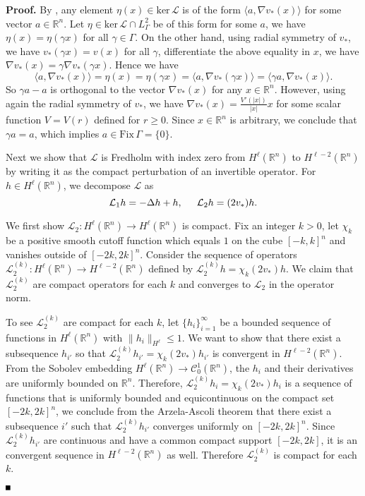 \documentclass[10pt]{article}
\newenvironment{Proof}%
 {\begin{trivlist} \item[]{\bf Proof. }}%
 {\hspace*{\fill}$\rule{.4\baselineskip}{.4\baselineskip}$\end{trivlist}}
\newcommand{\R}{\mathbb{R}}
\newcommand{\Ns}{\mathrm{ker\,}}
\newcommand{\cL}{\mathcal{L}}
\begin{document}
\begin{Proof} By \cite{gs}, any element $\eta(x) \in \Ns \cL$ is of the form $\langle a, \nabla v_*(x)\rangle$ for some vector $a \in \R^n$. Let $\eta \in \Ns \cL \cap L^2_{\Gamma}$ be of this form for some $a$, we have $\eta(x) = \eta(\gamma x)$ for all $\gamma \in \Gamma$.
On the other hand, using radial symmetry of $v_*$, we have $v_*(\gamma x) = v(x)$ for all $\gamma$, differentiate the above equality in $x$, we have $\nabla v_* (x) = \gamma \nabla v_* (\gamma x)$. Hence we have 
\[
\langle a,\nabla v_*(x) \rangle = \eta(x) = \eta(\gamma x) = \langle a, \nabla v_* (\gamma x)\rangle = \langle  \gamma a, \nabla v_*(x)\rangle. 
\]
So $\gamma a - a$ is orthogonal to the vector $\nabla v_*(x)$ for any $x \in \R^n$. However, using again the radial symmetry of $v_*$, we have $\nabla v_*(x)  = \frac{V'(|x|)}{|x|} x$ for some scalar function $V=V(r)$ defined for $r\ge 0$. Since $x \in \R^n$ is arbitrary, we conclude that $\gamma a =a$, which implies $a \in \mathrm{Fix}\,\Gamma = \{0\}$.


Next we show that $\cL$ is Fredholm with index zero from $H^\ell(\R^n)$ to $H^{\ell-2}(\R^n)$ by writing it as the compact perturbation of an invertible operator. For $h \in H^\ell(\R^n)$, we decompose $\mathcal{L}$ as
\[
\cL_1h = -\Delta h + h, \hspace{0.2in} \cL_2 h = (2v_*)h.
\] 

We first show $\cL_2: H^\ell(\R^n) \to H^\ell(\R^n)$ is compact. Fix an integer $k>0$, let $\chi_k$ be a positive smooth cutoff function which equals $1$ on the cube $[-k,k]^n$ and vanishes outside of $[-2k,2k]^n$. Consider the sequence of operators $\cL_2^{(k)} : H^\ell(\R^n) \to H^{\ell-2}(\R^n)$ defined by $\cL_2^{(k)} h = \chi_k (2v_*)h$. We claim that $\cL_2^{(k)}$ are compact operators for each $k$ and converges to $\cL_2$ in the operator norm.

To see $\cL_2^{(k)}$ are compact for each $k$, let $\{h_i\}_{i=1}^{\infty}$ be a bounded sequence of functions in $H^{\ell}(\R^n)$ with $\|h_i\|_{H^\ell} 
\le 1$. We want to show that there exist a subsequence $h_{i'}$ so that 
$\cL_2^{(k)} h_{i'} = \chi_k (2v_*)h_{i'}$ is convergent in $H^{\ell-2}(\R^n)$. From the Sobolev embedding $H^{\ell}(\R^n) \to 
\mathscr{C}^1_0(\R^n)$, the $h_i$ and their derivatives are uniformly 
bounded on $\R^n$. Therefore, $\cL_2^{(k)}h_i = \chi_k(2v_*)h_i$ is a 
sequence of functions that is uniformly bounded and equicontinuous on 
the compact set $[-2k,2k]^n$, we conclude from the Arzela-Ascoli 
theorem that there exist a subsequence $i'$ such that $\cL_2^{(k)}h_{i'}$ 
converges uniformly on $[-2k,2k]^n$. Since $\cL_2^{(k)}h_{i'}$ are 
continuous and have a common compact support $[-2k,2k]$, it is an 
convergent sequence in $H^{\ell-2}(\R^n)$ as well. Therefore $\cL_2^{(k)}$ is compact for each $k$.


\end{Proof}
\end{document}
